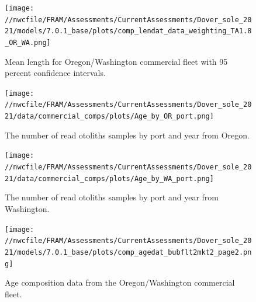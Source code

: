 \documentclass[11pt,
  english,
  a4paper,
]{article}
\begin{document}

\begin{figure}
\centering
\texttt{[image: //nwcfile/FRAM/Assessments/CurrentAssessments/Dover\_sole\_2021/models/7.0.1\_base/plots/comp\_lendat\_data\_weighting\_TA1.8\_OR\_WA.png]}
\caption{Mean length for Oregon/Washington commercial fleet with 95 percent confidence intervals.\label{fig:mean-orwa-len-data}}
\end{figure}

\tagmcend\tagstructend


\begin{figure}
\centering
\texttt{[image: //nwcfile/FRAM/Assessments/CurrentAssessments/Dover\_sole\_2021/data/commercial\_comps/plots/Age\_by\_OR\_port.png]}
\caption{The number of read otoliths samples by port and year from Oregon.\label{fig:or-age-port}}
\end{figure}

\tagmcend\tagstructend

\clearpage


\begin{figure}
\centering
\texttt{[image: //nwcfile/FRAM/Assessments/CurrentAssessments/Dover\_sole\_2021/data/commercial\_comps/plots/Age\_by\_WA\_port.png]}
\caption{The number of read otoliths samples by port and year from Washington.\label{fig:wa-age-port}}
\end{figure}

\tagmcend\tagstructend


\begin{figure}
\centering
\texttt{[image: //nwcfile/FRAM/Assessments/CurrentAssessments/Dover\_sole\_2021/models/7.0.1\_base/plots/comp\_agedat\_bubflt2mkt2\_page2.png]}
\caption{Age composition data from the Oregon/Washington commercial fleet.\label{fig:orwa-age-data}}
\end{figure}

\tagmcend\tagstructend
\end{document}
